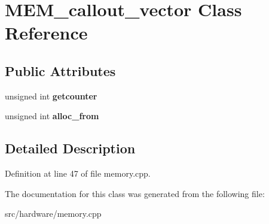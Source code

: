 \hypertarget{classMEM__callout__vector}{\section{M\-E\-M\-\_\-callout\-\_\-vector Class Reference}
\label{classMEM__callout__vector}
}
\subsection*{Public Attributes}
\begin{DoxyCompactItemize}
\item 
\hypertarget{classMEM__callout__vector_ae09b32d7854ef9163df3aa5cd4957956}{unsigned int {\bfseries getcounter}}\label{classMEM__callout__vector_ae09b32d7854ef9163df3aa5cd4957956}

\item 
\hypertarget{classMEM__callout__vector_a92ff2702b55bb31d7d9dc3f9e6ae4dc0}{unsigned int {\bfseries alloc\-\_\-from}}\label{classMEM__callout__vector_a92ff2702b55bb31d7d9dc3f9e6ae4dc0}

\end{DoxyCompactItemize}


\subsection{Detailed Description}


Definition at line 47 of file memory.\-cpp.



The documentation for this class was generated from the following file\-:\begin{DoxyCompactItemize}
\item 
src/hardware/memory.\-cpp\end{DoxyCompactItemize}
